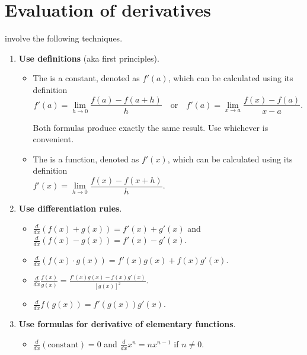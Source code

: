 \documentclass[../main.tex]{subfiles}
\begin{document}
 \section{Evaluation of derivatives}

 involve the following techniques.
\begin{enumerate}
  \item \textbf{Use definitions} (aka first principles).
    \begin{itemize}
      \item The  is a constant, denoted as \(f'(a)\), which can be calculated using its definition
        \[
          f'(a) = \lim_{h \to 0} \frac{f(a) - f(a + h)}{h}
          \quad\text{or}\quad
          f'(a) = \lim_{x \to a} \frac{f(x) - f(a)}{x - a}.
        \]

        Both formulas produce exactly the same result. Use whichever is convenient.

      \item The  is a function, denoted as \(f'(x)\), which can be calculated using its definition
        \[
          f'(x) = \lim_{h \to 0} \frac{f(x) - f(x + h)}{h}.
          \phantom{\quad\text{or}\quad
            f'(a) = \lim_{x \to a} \frac{f(x) - f(a)}{x - a}}
        \]
    \end{itemize}

  \item \textbf{Use differentiation rules}.
    \begin{itemize}
      \item \(\frac{d}{dx} \left( f(x) + g(x) \right) = f'(x) + g'(x)\) and \(\frac{d}{dx} \left( f(x) - g(x) \right) = f'(x) - g'(x)\).
      \item \(\frac{d}{dx} \left( f(x) \cdot g(x) \right) = f'(x)g(x) + f(x) g'(x)\).
      \item \(\frac{d}{dx} \frac{f(x)}{g(x)} = \frac{f'(x)g(x) - f(x) g'(x)}{\left[g(x)\right]^{2}}\).
      \item \(\frac{d}{dx} f(g(x)) = f'( g(x) ) g'(x)\).
    \end{itemize}

  \item \textbf{Use formulas for derivative of elementary functions}.
    \begin{itemize}
      \item \(\frac{d}{dx} (\text{constant}) = 0\) and \(\frac{d}{dx} x^{n} = n x^{n-1}\) if \(n \ne 0\).


\end{itemize}
\end{enumerate}
\end{document}
